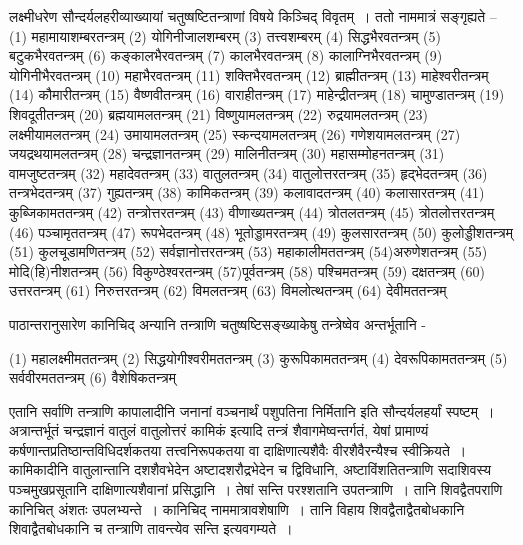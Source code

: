 {लक्ष्मीधरेण सौन्दर्यलहरीव्याख्यायां चतुष्षष्टितन्त्राणां विषये किञ्चिद् विवृतम्~। ततो नाम\-मात्रं सङ्गृह्यते –
(1) महामायाशम्बरतन्त्रम् (2) योगिनीजालशम्बरम् (3) तत्त्व\-शम्बरम् (4) सिद्धभैरवतन्त्रम् (5) बटुकभैरवतन्त्रम् (6) कङ्कालभैरवतन्त्रम् (7) कालभैरवतन्त्रम् (8) कालाग्निभैरवतन्त्रम् (9) योगिनीभैरवतन्त्रम् (10) महाभैरवतन्त्रम् (11) शक्तिभैरव\-तन्त्रम् (12) ब्राह्मीतन्त्रम् (13) माहेश्वरीतन्त्रम् (14) कौमारीतन्त्रम् (15) वैष्णवीतन्त्रम् (16) वाराहीतन्त्रम् (17) माहेन्द्रीतन्त्रम् (18) चामुण्डातन्त्रम् (19) शिवदूतीतन्त्रम् (20) \-ब्रह्मयामलतन्त्रम् (21) विष्णुयामलतन्त्रम् (22) रुद्रयामलतन्त्रम् (23) लक्ष्मीयामल\-तन्त्रम् (24) उमायामलतन्त्रम् (25) स्कन्दयामलतन्त्रम् (26) गणेशयामलतन्त्रम् (27) जय\-द्रथयामलतन्त्रम् (28) चन्द्रज्ञानतन्त्रम् (29) मालिनीतन्त्रम् (30) महासम्मोहनतन्त्रम् (31) वामजुष्टतन्त्रम् (32) महादेवतन्त्रम् (33) वातुलतन्त्रम् (34) वातुलोत्तरतन्त्रम् (35) हृद्भेद\-तन्त्रम् (36) तन्त्रभेदतन्त्रम् (37) गुह्यतन्त्रम् (38) कामिकतन्त्रम् (39) कलावादतन्त्रम् (40) कलासारतन्त्रम् (41) कुब्जिकामततन्त्रम् (42) तन्त्रोत्तरतन्त्रम् (43) वीणाख्य\-तन्त्रम् (44) त्रोतलतन्त्रम् (45) त्रोतलोत्तरतन्त्रम् (46) पञ्चामृततन्त्रम् (47) रूपभेद\-तन्त्रम् (48) भूतोड्डामरतन्त्रम् (49) कुलसारतन्त्रम् (50) कुलोड्डीशतन्त्रम् (51) कुलचूडा\-मणितन्त्रम् (52) सर्वज्ञानोत्तरतन्त्रम् (53) महाकालीमततन्त्रम् (54)अरुणेशतन्त्रम् (55) मोदि(हि)नीशतन्त्रम् (56) विकुण्ठेश्वरतन्त्रम् (57)पूर्वतन्त्रम् (58) पश्चिमतन्त्रम् (59) दक्षतन्त्रम् (60) उत्तरतन्त्रम् (61) निरुत्तरतन्त्रम् (62) विमलतन्त्रम् (63) विमलोत्थ\-तन्त्रम् (64) देवीमततन्त्रम्

पाठान्तरानुसारेण कानिचिद् अन्यानि तन्त्राणि चतुष्षष्टिसङ्ख्याकेषु तन्त्रेष्वेव अन्तर्भूतानि -

(1) महालक्ष्मीमततन्त्रम् 	(2) 	सिद्धयोगीश्वरीमततन्त्रम् 	(3) 	कुरूपिकामततन्त्रम् 	(4) 	देवरूपिकामततन्त्रम् 	(5) 	सर्ववीरमततन्त्रम् 	(6) 	वैशेषिकतन्त्रम्

एतानि सर्वाणि तन्त्राणि कापालादीनि जनानां वञ्चनार्थं पशुपतिना निर्मितानि इति सौन्दर्य\-लहर्यां स्पष्टम्~। अत्रान्तर्भूतं चन्द्रज्ञानं वातुलं वातुलोत्तरं कामिकं इत्यादि तन्त्रं शैवा\-गमेष्वन्तर्गतं, येषां प्रामाण्यं कर्षणान्तप्रतिष्ठान्तविधिदर्शकतया तत्त्वनिरूपकतया वा दाक्षिणात्यशैवैः वीर\-शैवैरन्यैश्च स्वीक्रियते~। कामिकादीनि वातुलान्तानि दशशैवभेदेन अष्टादशरौद्रभेदेन च द्विवि\-धानि, अष्टाविंशतितन्त्राणि सदाशिवस्य पञ्चमुखप्रसूतानि दाक्षिणात्यशैवानां प्रसिद्धानि~। तेषां सन्ति परश्शतानि उपतन्त्राणि~। तानि शिवद्वैतपराणि कानिचित् अंशतः उपलभ्यन्ते~। कानिचिद् नाममात्रावशेषाणि~। तानि विहाय शिवद्वैताद्वैतबोधकानि शिवाद्वैतबोधकानि च तन्त्राणि तावन्त्येव सन्ति इत्यवगम्यते~। 

}
